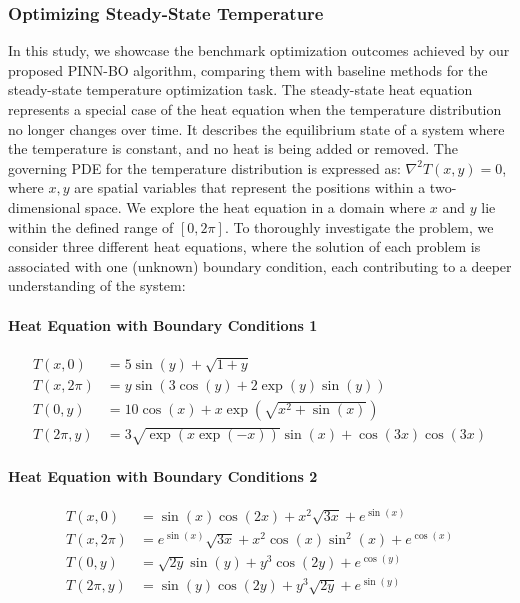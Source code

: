 \subsubsection{Optimizing Steady-State Temperature}
\label{section:pinn-bo_experiments_2d_laplace}
In this study, we showcase the benchmark optimization outcomes achieved by our proposed PINN-BO algorithm, comparing them with baseline methods for the steady-state temperature optimization task. The steady-state heat equation represents a special case of the heat equation when the temperature distribution no longer changes over time. It describes the equilibrium state of a system where the temperature is constant, and no heat is being added or removed.  The governing PDE for the temperature distribution is expressed as: $\nabla^2 T(x, y) = 0$, where $x, y$ are spatial variables that represent the positions within a two-dimensional space. We explore the heat equation in a domain where $x$ and $y$ lie within the defined range of $[0,2\pi]$. To thoroughly investigate the problem, we consider three different heat equations, where the solution of each problem is associated with one (unknown) boundary condition, each contributing to a deeper understanding of the system: 

 \paragraph{Heat Equation with Boundary Conditions 1}
 \label{para:heat1}
 \begin{align*}
     T(x, 0) &= 5\sin(y) + \sqrt{1+y} \\
    T(x, 2\pi) &= y\sin\left(3\cos(y) + 2\exp(y)\sin(y)\right) \\
   T(0, y) &= 10\cos(x) + x\exp(\sqrt{x^2 + \sin(x)}) \\
   T(2\pi, y) &= 3\sqrt{\exp(x\exp(-x))}\sin(x) + \cos(3x)\cos(3x)
 \end{align*}
 \paragraph{Heat Equation with Boundary Conditions 2}
 \label{para:heat2}
\begin{align*}
    T(x, 0) &= \sin(x) \cos(2x) + x^2\sqrt{3x}  + e^{\sin(x)} \\
    T(x, 2\pi) &= e^{\sin(x)} \sqrt{3x} + x^2 \cos(x)  \sin^2(x)   + e^{\cos(x)} \\
    T(0, y) &= \sqrt{2y}  \sin(y) + y^3\cos(2y)   + e^{\cos(y)} \\
    T(2\pi, y) &= \sin(y) \cos(2y) + y^3\sqrt{2y}   + e^{\sin(y)}
\end{align*}

